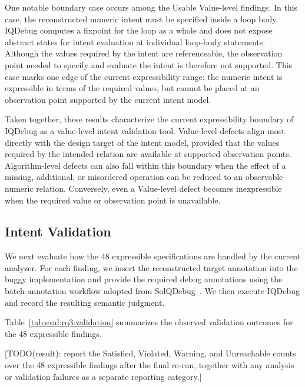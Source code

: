 \documentclass[11pt,oneside]{report}
\theoremstyle{plain}
\theoremstyle{definition}
\theoremstyle{remark}
\begin{document}
One notable boundary case occurs among the Usable Value-level findings.
In this case, the reconstructed numeric intent must be specified inside a
loop body. IQDebug computes a fixpoint for the loop as a whole and does
not expose abstract states for intent evaluation at individual loop-body
statements. Although the values required by the intent are referenceable, the
observation point needed to specify and evaluate the intent is therefore not
supported. This case marks one edge of the current expressibility range: the
numeric intent is expressible in terms of the required values, but cannot be
placed at an observation point supported by the current intent model.

Taken together, these results characterize the current expressibility boundary
of IQDebug as a value-level intent validation tool. Value-level defects
align most directly with the design target of the intent model, provided that the
values required by the intended relation are available at supported observation
points. Algorithm-level defects can also fall within this boundary when the
effect of a missing, additional, or misordered operation can be reduced to an
observable numeric relation. Conversely, even a Value-level defect becomes
inexpressible when the required value or observation point is unavailable.

\subsection{Intent Validation}\label{subsec:eval:rq3:validation}

We next evaluate how the 48 expressible specifications are handled by the
current analyzer. For each finding, we insert the reconstructed target
annotation into the buggy implementation and provide the required debug
annotations using the batch-annotation workflow adopted from
SolQDebug~\citep{solqdebug}. We then execute IQDebug and record the
resulting semantic judgment.

Table~\ref{tab:eval:rq3:validation} summarizes the observed validation outcomes for
the 48 expressible findings.

[TODO(result): report the Satisfied, Violated, Warning, and Unreachable counts
over the 48 expressible findings after the final re-run, together with any
analysis or validation failures as a separate reporting category.]
\end{document}
